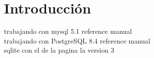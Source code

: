 \chapter{Introducción}
trabajando con mysql 5.1 reference manual\\

trabajando con PostgreSQL 8.4 reference manual\\

sqlite con el de la pagina la version 3\\
